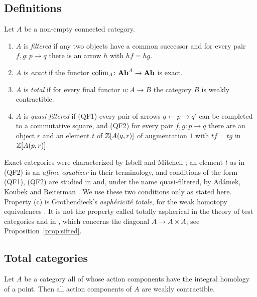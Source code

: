 \subsection{Definitions}

\begin{definition}\label{def:classes}
Let $A$ be a non-empty connected category.
\begin{enumerate}
\item[\textup{(a)}] $A$ is \emph{filtered} if any two objects have a common
 successor and for every pair $f,g\colon p\to q$ there is an arrow $h$ with
 $hf=hg$.
\item[\textup{(b)}] $A$ is \emph{exact} if the functor $\operatorname{colim}_A\colon\mathbf{Ab}^A\to\mathbf{Ab}$ is
 exact.
\item[\textup{(c)}] $A$ is \emph{total} if for every final functor $u\colon A\to B$
 the category $B$ is weakly contractible.
\item[\textup{(d)}] $A$ is \emph{quasi-filtered} if \textup{(QF1)} every pair of
 arrows $q\leftarrow p\to q'$ can be completed to a commutative square, and
 \textup{(QF2)} for every pair $f,g\colon p\to q$ there are an object $r$ and
 an element $t$ of $\mathbb{Z}[A(q,r)]$ of augmentation $1$ with $tf=tg$ in
 $\mathbb{Z}[A(p,r)]$.
\end{enumerate}
\end{definition}

Exact categories were characterized by Isbell and Mitchell
\cite{IM73,IM76}; an element $t$ as in (QF2) is an \emph{affine equalizer} in
their terminology, and conditions of the form (QF1), (QF2) are studied in
\cite{IM76} and, under the name quasi-filtered, by Ad\'amek, Koubek and
Reiterman \cite{AKR}. We use these two conditions only as stated here.
Property (c) is Grothendieck's \emph{asph\'ericit\'e totale}, for the weak
homotopy equivalences \cite[Chapter~II, ms.~p.~36ter; Chapter~XII,
D\'efinition~1]{Der}. It is not the property called totally aspherical in
the theory of test categories and in \cite{Rosicky}, which concerns the
diagonal $A\to A\times A$; see Proposition~\ref{prop:sifted}.

\subsection{Total categories}

\begin{lemma}\label{lem:acyclic}
Let $A$ be a category all of whose action components have the integral
homology of a point. Then all action components of $A$ are weakly
contractible.
\end{lemma}

